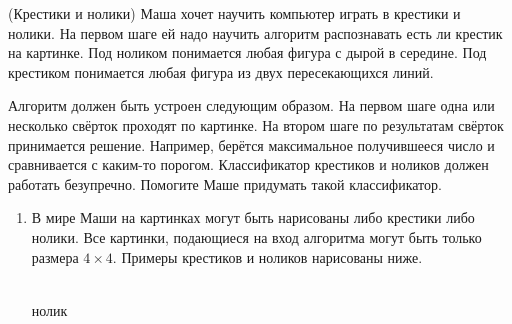 \begin{problem}{(Крестики и нолики)}
Маша хочет научить компьютер играть в крестики и нолики. На первом шаге ей надо научить алгоритм распознавать есть ли крестик на картинке. Под ноликом понимается любая фигура с дырой в середине. Под крестиком понимается любая фигура из двух пересекающихся линий.

Алгоритм должен быть устроен следующим образом. На первом шаге одна или несколько свёрток проходят по картинке. На втором шаге по результатам свёрток принимается решение. Например, берётся максимальное получившееся число и сравнивается с каким-то порогом. Классификатор крестиков и ноликов должен работать безупречно. Помогите Маше придумать такой классификатор. 

\begin{enumerate} 
    \item  В мире Маши на картинках могут быть нарисованы либо крестики либо нолики. Все картинки, подающиеся на вход алгоритма могут быть только размера $4 \times 4$. Примеры крестиков и ноликов нарисованы ниже. 
    
    \begin{minipage}{0.22\linewidth} 
        \centering
        \\ нолик
    \end{minipage} 
    \hfill
    \begin{minipage}{0.22\linewidth} 
        \centering
\end{minipage}
\end{enumerate}
\end{problem}
